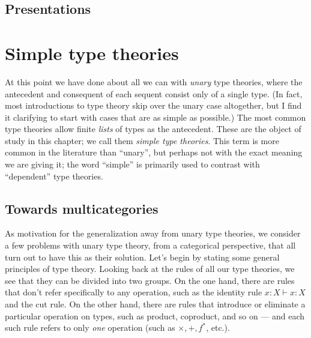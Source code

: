 \documentclass{book}
\let\types\vdash
\newcommand{\F}[1]{\mathfrak{F}_{#1}}
\begin{document}

\section{Presentations}
\label{sec:presentations}




\chapter{Simple type theories}
\label{chap:simple}

At this point we have done about all we can with \emph{unary} type theories, where the antecedent and consequent of each sequent consist only of a single type.
(In fact, most introductions to type theory skip over the unary case altogether, but I find it clarifying to start with cases that are as simple as possible.)
The most common type theories allow finite \emph{lists} of types as the antecedent.
These are the object of study in this chapter; we call them \emph{simple type theories}.
This term is more common in the literature than ``unary'', but perhaps not with the exact meaning we are giving it; the word ``simple'' is primarily used to contrast with ``dependent'' type theories.


\section{Towards multicategories}
\label{sec:why-multicats}

As motivation for the generalization away from unary type theories, we consider a few problems with unary type theory, from a categorical perspective, that all turn out to have this as their solution.
Let's begin by stating some general principles of type theory.
Looking back at the rules of all our type theories, we see that they can be divided into two groups.
On the one hand, there are rules that don't refer specifically to any operation, such as the identity rule $x:X \types x:X$ and the cut rule.
On the other hand, there are rules that introduce or eliminate a particular operation on types, such as product, coproduct, and so on --- and each such rule refers to only \emph{one} operation  (such as $\times,+,f^*$, etc.).
\end{document}
